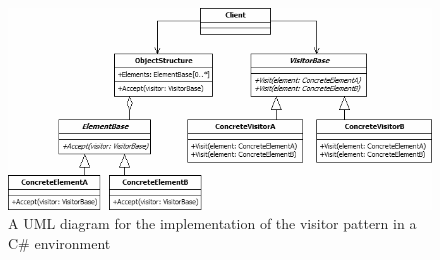 \begin{figure}[!ht]
\centering
 \includegraphics[width=1\textwidth]{figures/VisitorPattern.png} %
\caption{A UML diagram for the implementation of the visitor pattern in a C\# environment}\label{image:visitor}
\vspace{-15pt}
\end{figure}


